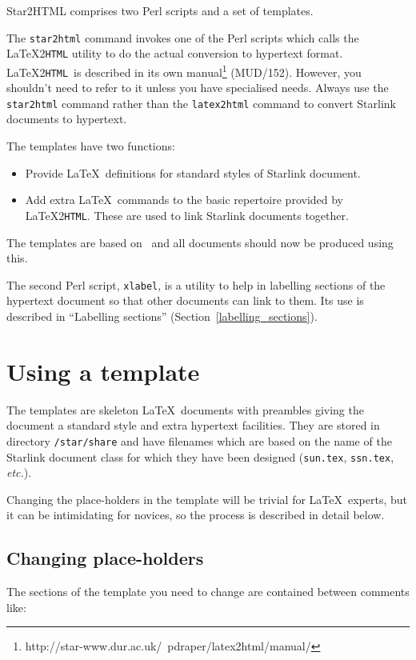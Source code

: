 \documentclass[twoside,11pt]{article}
\newcommand{\htmladdnormallinkfoot}[2]{#1\footnote{#2}}
\newcommand{\htmladdnormallink}[2]{#1}
\newcommand{\htmlref}[2]{#1}
\newcommand{\latex}[1]{#1}
\newcommand{\xlabel}[1]{}
\newcommand{\latextohtml}{\LaTeX2\texttt{HTML}}
\renewcommand{\_}{\texttt{\symbol{95}}}
\newcommand{\LtoHURL}{http://www.tex.ac.uk/tex-archive/support/latex2html/}
\newcommand{\LtoHManURL}{http://star-www.dur.ac.uk/~{}pdraper/latex2html/manual/}
\begin{document}
Star2HTML comprises two Perl scripts and a set of templates.

The
\htmlref{\texttt{star2html}}{star2html}
command invokes one of the Perl scripts which calls the
\htmladdnormallink{\latextohtml}{\LtoHURL}
utility to do the actual conversion to hypertext format.
\latextohtml\ is described in its own
\htmladdnormallinkfoot{manual}{\LtoHManURL}\latex{ (MUD/152)}.
However, you shouldn't need to refer to it unless you have specialised needs.
Always use the \texttt{star2html} command rather than the
\texttt{latex2html} command to convert Starlink documents to hypertext.

The templates have two functions:
\begin{itemize}
\item Provide \LaTeX\ definitions for standard styles of Starlink document.
\item Add extra \LaTeX\ commands to the basic repertoire provided by
\latextohtml.
These are used to link Starlink documents together.
\end{itemize}

The templates are based on \LaTeXe\, and all documents should now be
produced using this.

The second Perl script,
\htmlref{\texttt{xlabel}}{xlabel},
is a utility to help in labelling sections of the hypertext document so that
other documents can link to them.
Its use is described in
\htmlref{``Labelling sections''}{labelling_sections}
\latex{ (Section~\ref{labelling_sections})}.

\section{\xlabel{using_a_template}\label{using_a_template}Using a template}

The templates are skeleton \LaTeX\ documents with preambles giving
the document a standard style and extra hypertext facilities.
They are stored in directory \texttt{/star/share} and have filenames
which are based on the name of the Starlink document class for which they
have been designed (\texttt{sun.tex}, \texttt{ssn.tex}, \textit{etc.}).

Changing the place-holders in the template will be trivial for \LaTeX\
experts, but it can be intimidating for novices, so the process is
described in detail below.

\subsection{\xlabel{changing_placeholders}Changing place-holders}
The sections of the template you need to change are contained between comments
like:
\end{document}
